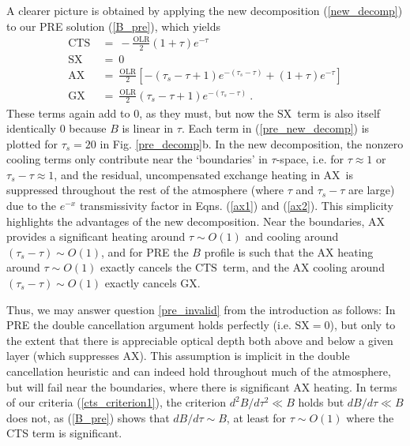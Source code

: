 \documentclass{ametsoc}
\newcommand{\beqn}{\begin{equation}}
\newcommand{\eeqn}{\end{equation}}
\newcommand{\eqnref}[1]{(\ref{#1})}
\newcommand{\OLR}{\ensuremath{\mathrm{OLR}}}
\newcommand{\taus}{\ensuremath{\tau_s}}
\newcommand{\SX}{\ensuremath{\mathrm{SX}}}
\newcommand{\AX}{\ensuremath{\mathrm{AX}}}
\newcommand{\GX}{\ensuremath{\mathrm{GX}}}
\newcommand{\CTS}{\ensuremath{\mathrm{CTS}}}
\begin{document}
A clearer picture is obtained by applying the new decomposition \eqnref{new_decomp} to our PRE solution \eqnref{B_pre},  which yields
\beqn
	\begin{split}
		\CTS &\ =\  -\frac{\OLR}{2}(1+\tau)e^{-\tau} \\
		\SX   &\ =\  0 \\
		\AX   &\ =\  \frac{\OLR}{2}\left[-(\taus-\tau+1)e^{-(\taus-\tau)} + (1+\tau) e^{-\tau} \right] \\
		\GX   &\ =\  \frac{\OLR}{2}(\taus-\tau+1)e^{-(\taus-\tau)}  \ .
	\end{split}
	\label{pre_new_decomp}
\eeqn
These terms again add to 0, as they must, but now  the \SX\ term is also itself identically 0 because $B$ is linear in $\tau$.  Each term in \eqnref{pre_new_decomp} is plotted for $\taus=20$ in Fig. \ref{pre_decomp}b. In the new decomposition, the nonzero cooling terms only contribute near the `boundaries' in $\tau$-space, i.e. for $\tau\approx 1$ or $\taus-\tau \approx 1$, and the residual, uncompensated exchange heating in \AX\ is suppressed  throughout the rest of the atmosphere (where $\tau$ and $\taus-\tau$ are large) due to the $e^{-x}$ transmissivity factor in Eqns. \eqnref{ax1} and \eqnref{ax2}. This simplicity highlights the advantages of the new decomposition. Near the boundaries,  AX provides a significant heating around $\tau\sim O(1)$  and  cooling around $(\taus-\tau)\sim O(1)$, and for PRE the $B$ profile is such that the AX heating around $\tau\sim O(1)$ exactly cancels the \CTS\ term, and the AX cooling around $(\taus-\tau)\sim O(1)$ exactly cancels \GX. 

Thus, we may answer question \ref{pre_invalid} from the introduction as follows: In PRE the double cancellation argument holds perfectly (i.e. $\SX=0$), but only to the extent that there is appreciable optical depth both above and below a given layer (which suppresses \AX). This assumption is implicit in the double cancellation heuristic and can indeed hold throughout much of the atmosphere, but will fail near the boundaries, where there is significant AX heating.  In terms of our criteria \eqnref{cts_criterion1}, the criterion $d^2 B/d \tau^2 \ll B$  holds but  $d B/d \tau \ll B$  does not, as \eqnref{B_pre} shows that $dB/d\tau \sim B$, at least for $\tau \sim O(1)$ where the CTS term is significant.

\end{document}
